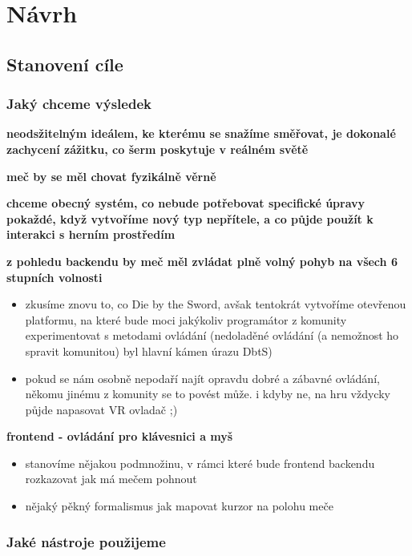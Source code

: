 \chapter{Návrh}

\section{Stanovení cíle}

\subsection{Jaký chceme výsledek}

\textbf{neodsžitelným ideálem, ke kterému se snažíme směřovat, je dokonalé zachycení zážitku, co šerm poskytuje v reálném světě}

\textbf{meč by se měl chovat fyzikálně věrně}

\textbf{chceme obecný systém, co nebude potřebovat specifické úpravy pokaždé, když vytvoříme nový typ nepřítele, a co půjde použít k interakci s herním prostředím}

\textbf{z pohledu backendu by meč měl zvládat plně volný pohyb na všech 6 stupních volnosti}
\begin{itemize}
    \item zkusíme znovu to, co Die by the Sword, avšak tentokrát vytvoříme otevřenou platformu, na které bude moci jakýkoliv programátor z komunity experimentovat s metodami ovládání (nedoladěné ovládání (a nemožnost ho spravit komunitou) byl hlavní kámen úrazu DbtS)
    \item pokud se nám osobně nepodaří najít opravdu dobré a zábavné ovládání, někomu jinému z komunity se to povést může. i kdyby ne, na hru vždycky půjde napasovat VR ovladač ;)
\end{itemize}

\textbf{frontend - ovládání pro klávesnici a myš}
\begin{itemize}
    \item stanovíme nějakou podmnožinu, v rámci které bude frontend backendu rozkazovat jak má mečem pohnout
    \item  nějaký pěkný formalismus jak mapovat kurzor na polohu meče
\end{itemize}


\subsection{Jaké nástroje použijeme}

